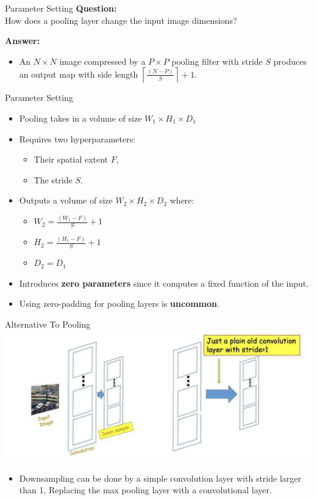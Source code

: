 \documentclass[default, aspectratio=169]{beamer}
\begin{document}
	\begin{frame}{Parameter Setting}
		\textbf{Question:} \\
		How does a pooling layer change the input image dimensions?
		
		\bigskip
		
		\textbf{Answer:} \\
		\begin{itemize}
			\item An $N \times N$ image compressed by a $P \times P$ pooling filter with stride $S$ produces an output map with side length $\left\lceil \frac{(N - P)}{S} \right\rceil + 1$.
			
		\end{itemize}
	\end{frame}
	\begin{frame}{Parameter Setting}
		\begin{itemize}
			\item Pooling takes in a volume of size $W_1 \times H_1 \times D_1$
			\item Requires two hyperparameters:
			\begin{itemize}
				\item Their spatial extent $F$,
				\item The stride $S$.
			\end{itemize}
			\item Outputs a volume of size $W_2 \times H_2 \times D_2$ where:
			\begin{itemize}
				\item $W_2 = \frac{(W_1 - F)}{S} + 1$
				\item $H_2 = \frac{(H_1 - F)}{S} + 1$
				\item $D_2 = D_1$
			\end{itemize}
			\item Introduces \textbf{zero parameters} since it computes a fixed function of the input.
			\item Using zero-padding for pooling layers is \textbf{uncommon}.
		\end{itemize}
	\end{frame}
	\begin{frame}{Alternative To Pooling}
		\centering
		\includegraphics[keepaspectratio, scale=0.55]{pic/pooling3.png}
		\smallskip
		\begin{itemize}
			\item Downsampling can be done by a simple convolution layer with stride larger than 1, Replacing the max pooling layer with a convolutional layer.
		\end{itemize}
		
	\end{frame}
\end{document}
